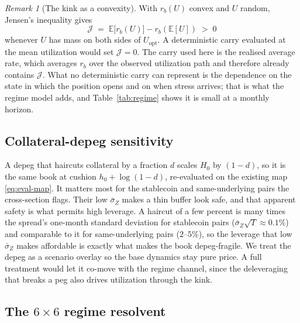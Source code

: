 \documentclass[11pt]{article}
\newcommand{\E}{\mathbb{E}}
\theoremstyle{plain}
\theoremstyle{definition}
\theoremstyle{remark}
\newtheorem{remark}{Remark}
\begin{document}
\begin{remark}[The kink as a convexity]\label{rem:jensen}
With $r_b(U)$ convex and $U$ random, Jensen's inequality gives
\begin{equation}\label{eq:jensen}
\mathcal J\;=\;\E\!\big[r_b(U)\big]-r_b(\E[U])\;>\;0
\end{equation}
whenever $U$ has mass on both sides of $U_{\mathrm{opt}}$. A deterministic carry evaluated at the
mean utilization would set $\mathcal J=0$. The carry used here is the realised average rate, which
averages $r_b$ over the observed utilization path and therefore already contains $\mathcal J$. What
no deterministic carry can represent is the dependence on the state in which the position opens and
on when stress arrives; that is what the regime model adds, and Table~\ref{tab:regime} shows it is
small at a monthly horizon.
\end{remark}

\subsection{Collateral-depeg sensitivity}\label{sec:carry-depeg}
A depeg that haircuts collateral by a fraction $d$ scales $H_0$ by $(1-d)$, so it is the same book at
cushion $h_0+\log(1-d)$, re-evaluated on the existing map \eqref{eq:eval-map}. It matters most for
the stablecoin and same-underlying pairs the cross-section flags. Their low $\bar\sigma_Z$ makes a
thin buffer look safe, and that apparent safety is what permits high leverage. A haircut of a few
percent is many times the spread's one-month standard deviation for stablecoin pairs
($\bar\sigma_Z\sqrt T\approx0.1\%$) and comparable to it for same-underlying pairs ($2$--$5\%$),
so the leverage that low $\bar\sigma_Z$ makes affordable is exactly what makes the book
depeg-fragile. We
treat the depeg as a scenario overlay so the base dynamics stay pure price. A full treatment would let
it co-move with the regime channel, since the deleveraging that breaks a peg also drives utilization
through the kink.

\subsection{The \texorpdfstring{$6\times6$}{6x6} regime resolvent}\label{app:regime}
\end{document}

